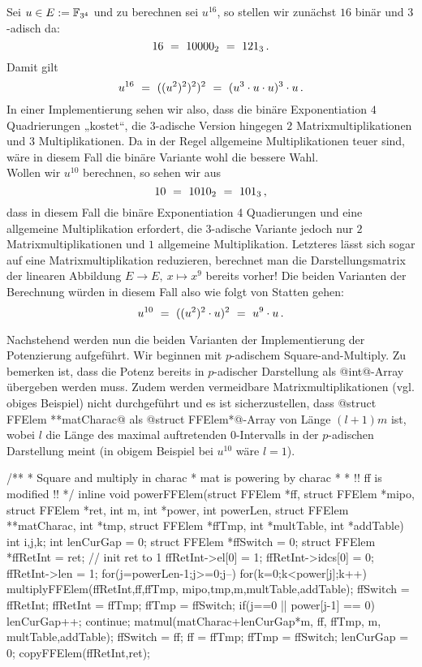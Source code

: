 \begin{beispiel}
  Sei $u \in E := \mathbb{F}_{3^4}$ und zu berechnen sei $u^{16}$, so stellen wir zunächst
  $16$ binär und $3$-adisch da:
  \[ 16 \ =\  10000_2 \ =\  121_3 \,.\]
  Damit gilt
  \[ u^{16} \ =\  ((u^2)^2)^2)^2 \ =\  (u^3\cdot u\cdot u)^3\cdot u\,.\]
  In einer Implementierung sehen wir also, dass die binäre Exponentiation 
  $4$ Quadrierungen „kostet“, die $3$-adische Version 
  hingegen $2$ Matrixmultiplikationen und $3$ Multiplikationen.
  Da in der Regel allgemeine Multiplikationen teuer sind, wäre in diesem Fall
  die binäre Variante wohl die bessere Wahl.\\
  Wollen wir $u^{10}$ berechnen, so sehen wir aus
  \[ 10 \ =\  1010_2 \ =\  101_3\,,\]
  dass in diesem Fall die binäre Exponentiation 4 Quadierungen und eine
  allgemeine Multiplikation erfordert, die $3$-adische Variante jedoch nur 
  $2$ Matrixmultiplikationen und $1$ allgemeine Multiplikation. Letzteres lässt
  sich sogar auf eine Matrixmultiplikation reduzieren, berechnet man die
  Darstellungsmatrix der linearen Abbildung $E\to E,\ x\mapsto x^9$ bereits
  vorher! Die beiden Varianten der Berechnung würden 
  in diesem Fall also wie folgt von Statten gehen:
  \[ u^{10} \ =\  ((u^2)^2\cdot u)^2 \ =\  u^9\cdot u\,.\]
\end{beispiel}

Nachstehend werden nun die beiden Varianten der Implementierung der Potenzierung
aufgeführt. Wir beginnen mit $p$-adischem Square-and-Multiply. Zu bemerken ist,
dass die Potenz bereits in $p$-adischer Darstellung als @int@-Array übergeben
werden muss. Zudem werden vermeidbare Matrixmultiplikationen (vgl. obiges
Beispiel) nicht durchgeführt und es ist sicherzustellen, 
dass @struct FFElem **matCharac@ als @struct FFElem*@-Array
von Länge $(l+1)m$ ist, wobei $l$ die Länge
des maximal auftretenden $0$-Intervalls in der $p$-adischen Darstellung meint 
(in obigem Beispiel bei $u^{10}$ wäre $l=1$).


\begin{ccode}[caption={Aus \url{../Sage/enumeratePCNs.c}},
  label=lst:powerffelem]
/**
 * Square and multiply in charac
 * mat is powering by charac
 *
 * !! ff is modified !!
 */
inline void powerFFElem(struct FFElem *ff, struct FFElem *mipo,
        struct FFElem *ret, 
        int m, int *power, int powerLen,
        struct FFElem **matCharac, int *tmp, struct FFElem *ffTmp,
        int *multTable, int *addTable){
    int i,j,k;
    int lenCurGap = 0;
    struct FFElem *ffSwitch = 0;
    struct FFElem *ffRetInt = ret;
    // init ret to 1
    ffRetInt->el[0] = 1; ffRetInt->idcs[0] = 0; ffRetInt->len = 1;
    for(j=powerLen-1;j>=0;j--){
        for(k=0;k<power[j];k++){
            multiplyFFElem(ffRetInt,ff,ffTmp, mipo,tmp,m,multTable,addTable);
            ffSwitch = ffRetInt; ffRetInt = ffTmp; ffTmp = ffSwitch;
        }
        if(j==0 || power[j-1] == 0){
            lenCurGap++;
            continue;
        }
        matmul(matCharac+lenCurGap*m, ff, ffTmp, m, multTable,addTable);
        ffSwitch = ff; ff = ffTmp; ffTmp = ffSwitch;
        lenCurGap = 0;
    }
    copyFFElem(ffRetInt,ret);
}
\end{ccode}


